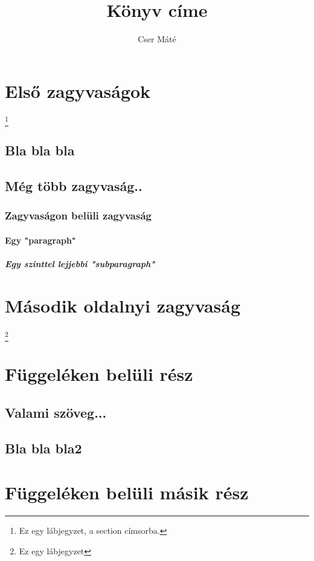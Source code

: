 \documentclass[twocolumn]{book}
\begin{document}
\title{Könyv címe}
\author{Cser Máté}
\maketitle

\tableofcontents
\newpage

\section[zagyvaság]{Első zagyvaságok}
\footnote{Ez egy lábjegyzet, a section címsorba.}
\subsection{Bla bla bla}
\hulipsum[2]
\subsection{Még több zagyvaság..}
\hulipsum[2]
\subsubsection{Zagyvaságon belüli zagyvaság}
\paragraph{Egy "paragraph"}
\subparagraph{Egy szinttel lejjebbi "subparagraph"}
\newpage
\section{Második oldalnyi zagyvaság}
\hulipsum[2-3] \linebreak
\footnote{Ez egy lábjegyzet}

\appendix
\section{Függeléken belüli rész}
\subsection{Valami szöveg...}
\subsection{Bla bla bla2}

\section{Függeléken belüli másik rész}
\end{document}
